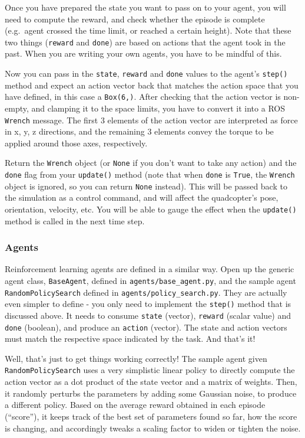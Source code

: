 \documentclass[11pt]{article}
\begin{document}
Once you have prepared the state you want to pass on to your agent, you
will need to compute the reward, and check whether the episode is
complete (e.g.~agent crossed the time limit, or reached a certain
height). Note that these two things (\texttt{reward} and \texttt{done})
are based on actions that the agent took in the past. When you are
writing your own agents, you have to be mindful of this.

Now you can pass in the \texttt{state}, \texttt{reward} and
\texttt{done} values to the agent's \texttt{step()} method and expect an
action vector back that matches the action space that you have defined,
in this case a \texttt{Box(6,)}. After checking that the action vector
is non-empty, and clamping it to the space limits, you have to convert
it into a ROS \texttt{Wrench} message. The first 3 elements of the
action vector are interpreted as force in x, y, z directions, and the
remaining 3 elements convey the torque to be applied around those axes,
respectively.

Return the \texttt{Wrench} object (or \texttt{None} if you don't want to
take any action) and the \texttt{done} flag from your \texttt{update()}
method (note that when \texttt{done} is \texttt{True}, the
\texttt{Wrench} object is ignored, so you can return \texttt{None}
instead). This will be passed back to the simulation as a control
command, and will affect the quadcopter's pose, orientation, velocity,
etc. You will be able to gauge the effect when the \texttt{update()}
method is called in the next time step.

\hypertarget{agents}{%
\subsubsection{Agents}\label{agents}}

Reinforcement learning agents are defined in a similar way. Open up the
generic agent class, \texttt{BaseAgent}, defined in
\texttt{agents/base\_agent.py}, and the sample agent
\texttt{RandomPolicySearch} defined in
\texttt{agents/policy\_search.py}. They are actually even simpler to
define - you only need to implement the \texttt{step()} method that is
discussed above. It needs to consume \texttt{state} (vector),
\texttt{reward} (scalar value) and \texttt{done} (boolean), and produce
an \texttt{action} (vector). The state and action vectors must match the
respective space indicated by the task. And that's it!

Well, that's just to get things working correctly! The sample agent
given \texttt{RandomPolicySearch} uses a very simplistic linear policy
to directly compute the action vector as a dot product of the state
vector and a matrix of weights. Then, it randomly perturbs the
parameters by adding some Gaussian noise, to produce a different policy.
Based on the average reward obtained in each episode (``score''), it
keeps track of the best set of parameters found so far, how the score is
changing, and accordingly tweaks a scaling factor to widen or tighten
the noise.
\end{document}
